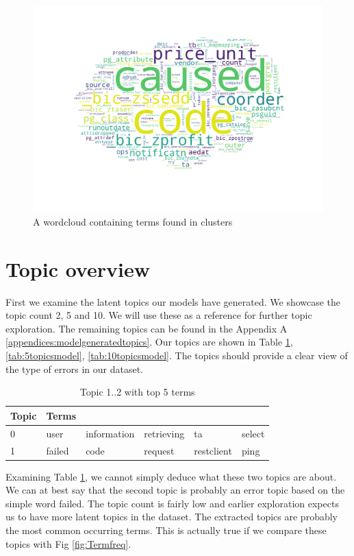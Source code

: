  \begin{figure}[h]
    \centering
    \includegraphics[width=15cm, height=8cm]{figures/wc.png}
    \caption{A wordcloud containing terms found in clusters}
    \label{fig:worldcloud}
\end{figure}

\FloatBarrier

\section{Topic overview}\label{results:topics}
First we examine the latent topics our models have generated. We showcase the topic count 2, 5 and 10. We will use these as a reference for further topic exploration. The remaining topics can be found in the Appendix A \ref{appendices:modelgeneratedtopics}. Our topics are shown in Table \ref{tab:2topicsmodel}, \ref{tab:5topicsmodel}, \ref{tab:10topicsmodel}. The topics should provide a clear view of the type of errors in our dataset.

\begin{table}[h]
\centering
\begin{tabular}{|l|l|l|l|l|l|}
 \hline
 Topic & Terms & & & & \\
 \hline
 \hline
 0 & user & information & retrieving & ta & select\\ 
 \hline 
 1 & failed & code & request & restclient & ping\\ 
 \hline 
\end{tabular}
\caption{Topic 1..2 with top 5 terms}
\label{tab:2topicsmodel}
\end{table}

Examining Table \ref{tab:2topicsmodel}, we cannot simply deduce what these two topics are about. We can at best say that the second topic is probably an error topic based on the simple word failed. The topic count is fairly low and earlier exploration expects us to have more latent topics in the dataset. The extracted topics are probably the most common occurring terms. This is actually true if we compare these topics with Fig \ref{fig:Termfreq}.


